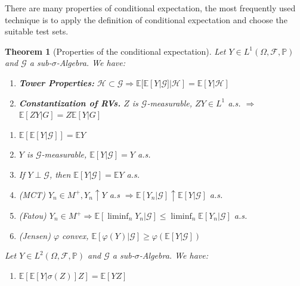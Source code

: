 \documentclass[a4paper,11pt]{book}
\newtheorem{theorem}{Theorem}[section]
\theoremstyle{definition}
\theoremstyle{remark}
\begin{document}
There are many properties of conditional expectation, the most frequently used technique is to apply the definition of conditional expectation and choose the suitable test sets.

\begin{theorem}[Properties of the conditional expectation]
Let $Y \in L^1(\Omega, \mathcal{F}, \mathbb{P})$ and $\mathcal{G}$ a sub-$\sigma$-Algebra. We have:
\begin{enumerate}
	\item \textbf{Tower Properties: }$\mathcal{H} \subset \mathcal{G} \Rightarrow \mathbb{E}[\mathbb{E}[Y|\mathcal{G}]|\mathcal{H}] = \mathbb{E}[Y|\mathcal{H}]$ 
	\item \textbf{Constantization of RVs.} $Z$ is $\mathcal{G}$-measurable, $ZY \in L^1$ a.s. $\Rightarrow$ $\mathbb{E}[ZY|G] = Z\mathbb{E}[Y|G]$
\end{enumerate}

\begin{enumerate}
	\item $\mathbb{E}[\mathbb{E}[ Y|\mathcal{G}]] = \mathbb{E}Y$  
	\item $Y$ is $\mathcal{G}$-measurable, $\mathbb{E}[Y|\mathcal{G}] = Y$ a.s.
	\item If $Y \perp \mathcal{G}$, then $\mathbb{E}[Y|\mathcal{G}] = \mathbb{E}Y$ a.s.
	\item(MCT) $Y_n \in M^+, Y_n \uparrow Y$ a.s $\Rightarrow \mathbb{E}[Y_n|\mathcal{G}] \uparrow \mathbb{E}[Y| \mathcal{G}]$ a.s.
	\item(Fatou) $Y_n \in M^+ \Rightarrow \mathbb{E}[\liminf_n Y_n|\mathcal{G}] \leq \liminf_n \mathbb{E}[Y_n | \mathcal{G}]$ a.s.
	\item(Jensen) $\varphi$ convex,  $\mathbb{E}[\varphi(Y)|\mathcal{G}] \geq \varphi(\mathbb{E}[Y|\mathcal{G}])$
\end{enumerate}
	Let $Y \in L^2(\Omega, \mathcal{F}, \mathbb{P})$ and $\mathcal{G}$ a sub-$\sigma$-Algebra. We have:
	\begin{enumerate}
		\item $\mathbb{E}[\mathbb{E}[Y|\sigma(Z)]Z] = \mathbb{E}[YZ]$
	\end{enumerate}
\end{theorem}
\end{document}
